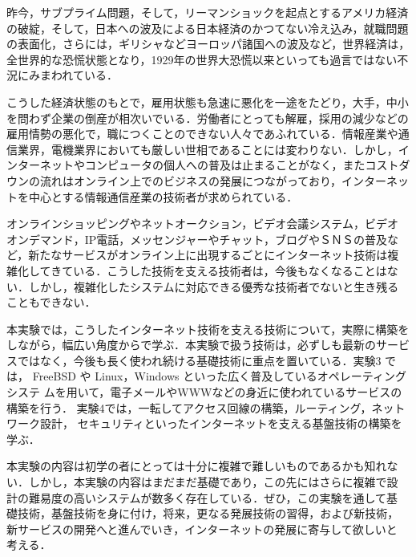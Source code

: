 %
%

昨今，サブプライム問題，そして，リーマンショックを起点とするアメリカ経済
の破綻，そして，日本への波及による日本経済のかつてない冷え込み，就職問題
の表面化，さらには，ギリシャなどヨーロッパ諸国への波及など，世界経済は，
全世界的な恐慌状態となり，1929年の世界大恐慌以来といっても過言ではない不
況にみまわれている．

こうした経済状態のもとで，雇用状態も急速に悪化を一途をたどり，大手，中小
を問わず企業の倒産が相次いでいる．労働者にとっても解雇，採用の減少などの
雇用情勢の悪化で，職につくことのできない人々であふれている．情報産業や通
信業界，電機業界においても厳しい世相であることには変わりない．しかし，イ
ンターネットやコンピュータの個人への普及は止まることがなく，またコストダ
ウンの流れはオンライン上でのビジネスの発展につながっており，インターネッ
トを中心とする情報通信産業の技術者が求められている．

オンラインショッピングやネットオークション，ビデオ会議システム，ビデオ
オンデマンド，IP電話，メッセンジャーやチャット，ブログやＳＮＳの普及な
ど，新たなサービスがオンライン上に出現するごとにインターネット技術は複
雑化してきている．こうした技術を支える技術者は，今後もなくなることはな
い．しかし，複雑化したシステムに対応できる優秀な技術者でないと生き残る
こともできない．

本実験では，こうしたインターネット技術を支える技術について，実際に構築を
しながら，幅広い角度からで学ぶ．本実験で扱う技術は，必ずしも最新のサービ
スではなく，今後も長く使われ続ける基礎技術に重点を置いている．実験3 では，
FreeBSD や Linux，Windows といった広く普及しているオペレーティングシステ
ムを用いて，電子メールやWWWなどの身近に使われているサービスの構築を行う．
実験4では，一転してアクセス回線の構築，ルーティング，ネットワーク設計，
セキュリティといったインターネットを支える基盤技術の構築を学ぶ．

本実験の内容は初学の者にとっては十分に複雑で難しいものであるかも知れな
い．しかし，本実験の内容はまだまだ基礎であり，この先にはさらに複雑で設
計の難易度の高いシステムが数多く存在している．ぜひ，この実験を通して基
礎技術，基盤技術を身に付け，将来，更なる発展技術の習得，および新技術，
新サービスの開発へと進んでいき，インターネットの発展に寄与して欲しいと
考える．
